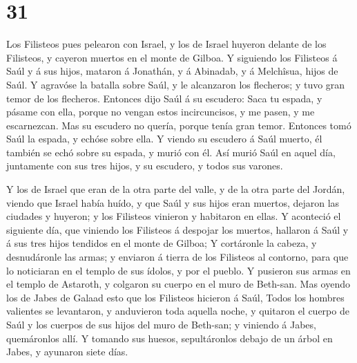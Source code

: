 \hypertarget{section-30}{%
\section{31}\label{section-30}}

 Los Filisteos pues pelearon con Israel, y los de Israel
huyeron delante de los Filisteos, y cayeron muertos en el monte de
Gilboa.  Y siguiendo los Filisteos á Saúl y á sus hijos,
mataron á Jonathán, y á Abinadab, y á Melchîsua, hijos de Saúl.
 Y agravóse la batalla sobre Saúl, y le alcanzaron los
flecheros; y tuvo gran temor de los flecheros.  Entonces
dijo Saúl á su escudero: Saca tu espada, y pásame con ella, porque no
vengan estos incircuncisos, y me pasen, y me escarnezcan. Mas su
escudero no quería, porque tenía gran temor. Entonces tomó Saúl la
espada, y echóse sobre ella.  Y viendo su escudero á Saúl
muerto, él también se echó sobre su espada, y murió con él. 
Así murió Saúl en aquel día, juntamente con sus tres hijos, y su
escudero, y todos sus varones.

 Y los de Israel que eran de la otra parte del valle, y de
la otra parte del Jordán, viendo que Israel había huído, y que Saúl y
sus hijos eran muertos, dejaron las ciudades y huyeron; y los Filisteos
vinieron y habitaron en ellas.  Y aconteció el siguiente
día, que viniendo los Filisteos á despojar los muertos, hallaron á Saúl
y á sus tres hijos tendidos en el monte de Gilboa;  Y
cortáronle la cabeza, y desnudáronle las armas; y enviaron á tierra de
los Filisteos al contorno, para que lo noticiaran en el templo de sus
ídolos, y por el pueblo.  Y pusieron sus armas en el templo
de Astaroth, y colgaron su cuerpo en el muro de Beth-san. 
Mas oyendo los de Jabes de Galaad esto que los Filisteos hicieron á
Saúl,  Todos los hombres valientes se levantaron, y
anduvieron toda aquella noche, y quitaron el cuerpo de Saúl y los
cuerpos de sus hijos del muro de Beth-san; y viniendo á Jabes,
quemáronlos allí.  Y tomando sus huesos, sepultáronlos
debajo de un árbol en Jabes, y ayunaron siete días.
